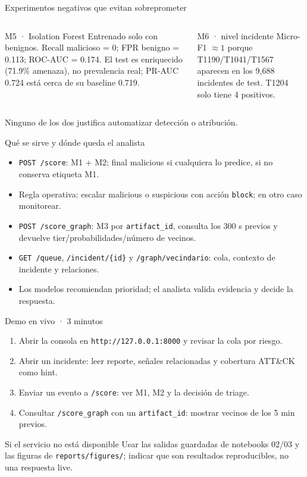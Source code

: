 \documentclass[aspectratio=169,10pt]{beamer}
\begin{document}
\begin{frame}{Experimentos negativos que evitan sobreprometer}
\begin{columns}[T,onlytextwidth]
  \begin{block}{M5 · Isolation Forest}
    Entrenado solo con benignos. Recall malicioso = 0; FPR benigno = 0.113; ROC-AUC = 0.174. El test es enriquecido (71.9\% amenaza), no prevalencia real; PR-AUC 0.724 está cerca de su baseline 0.719.
  \end{block}
  \begin{block}{M6 · nivel incidente}
    Micro-F1 $\approx 1$ porque T1190/T1041/T1567 aparecen en los 9,688 incidentes de test. T1204 solo tiene 4 positivos.
  \end{block}
\end{columns}
\vspace{0.2cm}
\centering
Ninguno de los dos justifica automatizar detección o atribución.
\end{frame}

\begin{frame}{Qué se sirve y dónde queda el analista}
\begin{itemize}
  \item \texttt{POST /score}: M1 + M2; final malicious si cualquiera lo predice, si no conserva etiqueta M1.
  \item Regla operativa: escalar malicious o suspicious con acción \texttt{block}; en otro caso monitorear.
  \item \texttt{POST /score\_graph}: M3 por \texttt{artifact\_id}, consulta los 300 s previos y devuelve tier/probabilidades/número de vecinos.
  \item \texttt{GET /queue}, \texttt{/incident/\{id\}} y \texttt{/graph/vecindario}: cola, contexto de incidente y relaciones.
  \item Los modelos recomiendan prioridad; el analista valida evidencia y decide la respuesta.
\end{itemize}
\end{frame}

\begin{frame}{Demo en vivo · 3 minutos}
\begin{enumerate}
  \item Abrir la consola en \texttt{http://127.0.0.1:8000} y revisar la cola por riesgo.
  \item Abrir un incidente: leer reporte, señales relacionadas y cobertura ATT\&CK como hint.
  \item Enviar un evento a \texttt{/score}: ver M1, M2 y la decisión de triage.
  \item Consultar \texttt{/score\_graph} con un \texttt{artifact\_id}: mostrar vecinos de los 5 min previos.
\end{enumerate}
\begin{alertblock}{Si el servicio no está disponible}
  Usar las salidas guardadas de notebooks 02/03 y las figuras de \texttt{reports/figures/}; indicar que son resultados reproducibles, no una respuesta live.
\end{alertblock}
\end{frame}
\end{document}
